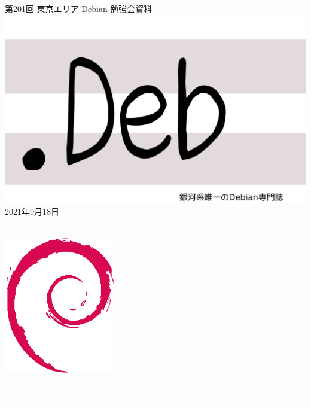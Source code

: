 \documentclass[mingoth,a4paper]{jsarticle}
\newcommand{\debmtgyear}{2021}
\newcommand{\debmtgmonth}{9}
\newcommand{\debmtgdate}{18}
\newcommand{\debmtgnumber}{201}
\begin{document}
\begin{titlepage}
\thispagestyle{empty}

\vspace*{-2cm}
第\debmtgnumber{}回 東京エリア Debian 勉強会資料\\
\hspace*{-2cm}
\includegraphics{image-assets/dotdeb.pdf}\\
\hfill{}\debmtgyear{}年\debmtgmonth{}月\debmtgdate{}日

\\

\vspace*{-2cm}
\hfill{}\includegraphics[height=6cm]{image-assets/openlogo-nd.eps}
\end{titlepage}

\newpage

\begin{minipage}[b]{0.2\hsize}
 \colorbox{titleback}{}
\end{minipage}
\begin{minipage}[b]{0.8\hsize}
\hrule
\vspace{2mm}
\hrule
\begin{multicols}{2}
\tableofcontents
\end{multicols}
\vspace{2mm}
\hrule
\end{minipage}
\end{document}
